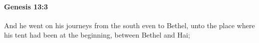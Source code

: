 
		\paragraph{Genesis 13:3} %
			\label{GENESIS-13-3}

			And he went on his journeys from the south even to Bethel, unto the place where his tent had been at the beginning, between Bethel and Hai;


